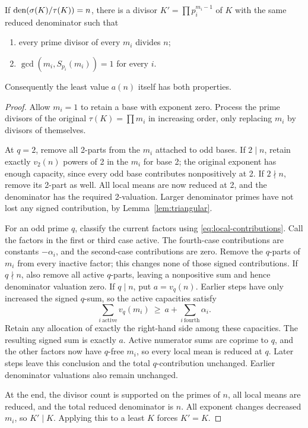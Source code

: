 \begin{theorem}\label{thm:normal}
If $\operatorname{den}(\sigma(K)/\tau(K))=n$, there is a divisor
$K'=\prod p_i^{m_i-1}$ of $K$ with the same reduced denominator such that
\begin{enumerate}
\item every prime divisor of every $m_i$ divides $n$;
\item $\gcd(m_i,S_{p_i}(m_i))=1$ for every $i$.
\end{enumerate}
Consequently the least value $a(n)$ itself has both properties.
\end{theorem}
\begin{proof}
Allow $m_i=1$ to retain a base with exponent zero. Process the prime
divisors of the original $\tau(K)=\prod m_i$ in increasing order,
only replacing $m_i$ by divisors of themselves.

At $q=2$, remove all 2-parts from the $m_i$ attached to odd bases.
If $2\mid n$, retain exactly $v_2(n)$ powers of 2 in the $m_i$ for
base 2; the original exponent has enough capacity, since every odd
base contributes nonpositively at 2. If $2\nmid n$, remove its 2-part
as well. All local means are now reduced at 2, and the denominator has
the required 2-valuation. Larger denominator primes have not lost
any signed contribution, by Lemma~\ref{lem:triangular}.

For an odd prime $q$, classify the current factors using
\eqref{eq:local-contributions}. Call the factors in the first or third
case active. The fourth-case contributions are constants $-\alpha_i$,
and the second-case contributions are zero. Remove the $q$-parts of
$m_i$ from every inactive factor; this changes none of those signed
contributions. If $q\nmid n$, also remove all active $q$-parts, leaving
a nonpositive sum and hence denominator valuation zero.
If $q\mid n$, put $a=v_q(n)$. Earlier steps have only increased the
signed $q$-sum, so the active capacities satisfy
\[
 \sum_{i\ \mathrm{active}}v_q(m_i)\ \ge\ a+\sum_{i\ \mathrm{fourth}}\alpha_i.
\]
Retain any allocation of exactly the right-hand side among these
capacities. The resulting signed sum is exactly $a$.
Active numerator sums are coprime to $q$, and the other factors now
have $q$-free $m_i$, so every local mean is reduced at $q$.
Later steps leave this conclusion and the total $q$-contribution
unchanged. Earlier denominator valuations also remain unchanged.

At the end, the divisor count is supported on the primes of $n$, all
local means are reduced, and the total reduced denominator is $n$.
All exponent changes decreased $m_i$, so $K'\mid K$.
Applying this to a least $K$ forces $K'=K$.
\end{proof}

